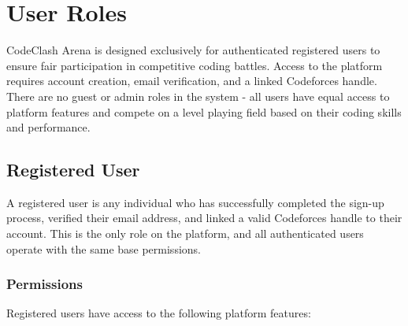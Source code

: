 \documentclass[12pt,a4paper]{article}
\begin{document}
\FloatBarrier


\section{User Roles}

CodeClash Arena is designed exclusively for authenticated registered users to ensure fair participation in competitive coding battles. Access to the platform requires account creation, email verification, and a linked Codeforces handle. There are no guest or admin roles in the system - all users have equal access to platform features and compete on a level playing field based on their coding skills and performance.

\subsection{Registered User}

A registered user is any individual who has successfully completed the sign-up process, verified their email address, and linked a valid Codeforces handle to their account. This is the only role on the platform, and all authenticated users operate with the same base permissions.

\subsubsection{Permissions}

Registered users have access to the following platform features:
\end{document}
